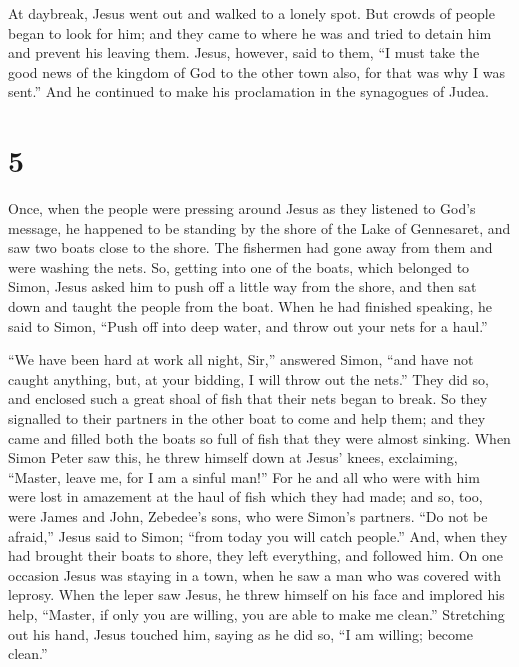  At daybreak, Jesus went out and walked to a lonely spot.
But crowds of people began to look for him; and they came to where he
was and tried to detain him and prevent his leaving them. 
Jesus, however, said to them, ``I must take the good news of the kingdom
of God to the other town also, for that was why I was sent.''
 And he continued to make his proclamation in the
synagogues of Judea.

\hypertarget{section-3}{%
\section{5}\label{section-3}}

 Once, when the people were pressing around Jesus as they
listened to God's message, he happened to be standing by the shore of
the Lake of Gennesaret, and saw two boats close to the shore.
 The fishermen had gone away from them and were washing the
nets.  So, getting into one of the boats, which belonged to
Simon, Jesus asked him to push off a little way from the shore, and then
sat down and taught the people from the boat.  When he had
finished speaking, he said to Simon, ``Push off into deep water, and
throw out your nets for a haul.''

 ``We have been hard at work all night, Sir,'' answered
Simon, ``and have not caught anything, but, at your bidding, I will
throw out the nets.''  They did so, and enclosed such a
great shoal of fish that their nets began to break.  So they
signalled to their partners in the other boat to come and help them; and
they came and filled both the boats so full of fish that they were
almost sinking.  When Simon Peter saw this, he threw himself
down at Jesus' knees, exclaiming, ``Master, leave me, for I am a sinful
man!''  For he and all who were with him were lost in
amazement at the haul of fish which they had made;  and so,
too, were James and John, Zebedee's sons, who were Simon's partners.
``Do not be afraid,'' Jesus said to Simon; ``from today you will catch
people.''  And, when they had brought their boats to shore,
they left everything, and followed him.  On one occasion
Jesus was staying in a town, when he saw a man who was covered with
leprosy. When the leper saw Jesus, he threw himself on his face and
implored his help, ``Master, if only you are willing, you are able to
make me clean.''  Stretching out his hand, Jesus touched
him, saying as he did so, ``I am willing; become clean.''

